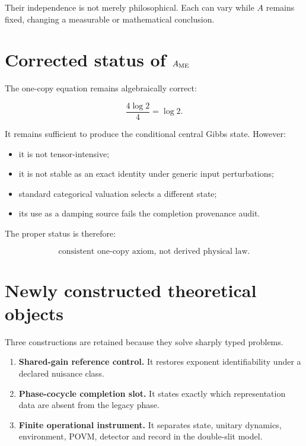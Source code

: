 \documentclass[11pt,a4paper,openany]{report}
\begin{document}
Their independence is not merely philosophical. Each can vary while \(A\) remains fixed, changing a measurable or mathematical conclusion.

\section{\texorpdfstring{Corrected status of \(A_{\rm ME}\)}{Corrected status of A\_ ME}}

The one-copy equation remains algebraically correct:

\[
\frac{4\log2}{4}=\log2.
\]

It remains sufficient to produce the conditional central Gibbs state. However:

\begin{itemize}
\item 
it is not tensor-intensive;

\item 
it is not stable as an exact identity under generic input perturbations;

\item 
standard categorical valuation selects a different state;

\item 
its use as a damping source fails the completion provenance audit.

\end{itemize}

The proper status is therefore:

\[
\boxed{\text{consistent one-copy axiom, not derived physical law}.}
\]

\section{Newly constructed theoretical objects}

Three constructions are retained because they solve sharply typed problems.

\begin{enumerate}
\item 
\textbf{Shared-gain reference control.} It restores exponent identifiability under a declared nuisance class.

\item 
\textbf{Phase-cocycle completion slot.} It states exactly which representation data are absent from the legacy phase.

\item 
\textbf{Finite operational instrument.} It separates state, unitary dynamics, environment, POVM, detector and record in the double-slit model.

\end{enumerate}
\end{document}

